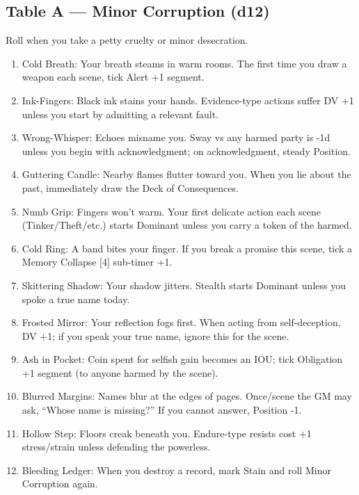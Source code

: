 \documentclass[18pt, letterpaper, twoside]{article}
\newcommand{\corruptiontitle}[1]{\subsection*{#1}}
\begin{document}
\corruptiontitle{Table A --- Minor Corruption (d12)}
Roll when you take a petty cruelty or minor desecration.
\begin{enumerate}
    \item Cold Breath: Your breath steams in warm rooms. The first time you draw a weapon each scene, tick Alert +1 segment.
    \item Ink-Fingers: Black ink stains your hands. Evidence-type actions suffer DV +1 unless you start by admitting a relevant fault.
    \item Wrong-Whisper: Echoes misname you. Sway vs any harmed party is -1d unless you begin with acknowledgment; on acknowledgment, steady Position.
    \item Guttering Candle: Nearby flames flutter toward you. When you lie about the past, immediately draw the Deck of Consequences.
    \item Numb Grip: Fingers won't warm. Your first delicate action each scene (Tinker/Theft/etc.) starts Dominant unless you carry a token of the harmed.
    \item Cold Ring: A band bites your finger. If you break a promise this scene, tick a Memory Collapse [4] sub-timer +1.
    \item Skittering Shadow: Your shadow jitters. Stealth starts Dominant unless you spoke a true name today.
    \item Frosted Mirror: Your reflection fogs first. When acting from self-deception, DV +1; if you speak your true name, ignore this for the scene.
    \item Ash in Pocket: Coin spent for selfish gain becomes an IOU; tick Obligation +1 segment (to anyone harmed by the scene).
    \item Blurred Margins: Names blur at the edges of pages. Once/scene the GM may ask, ``Whose name is missing?'' If you cannot answer, Position -1.
    \item Hollow Step: Floors creak beneath you. Endure-type resists cost +1 stress/strain unless defending the powerless.
    \item Bleeding Ledger: When you destroy a record, mark Stain and roll Minor Corruption again.
\end{enumerate}
\end{document}
